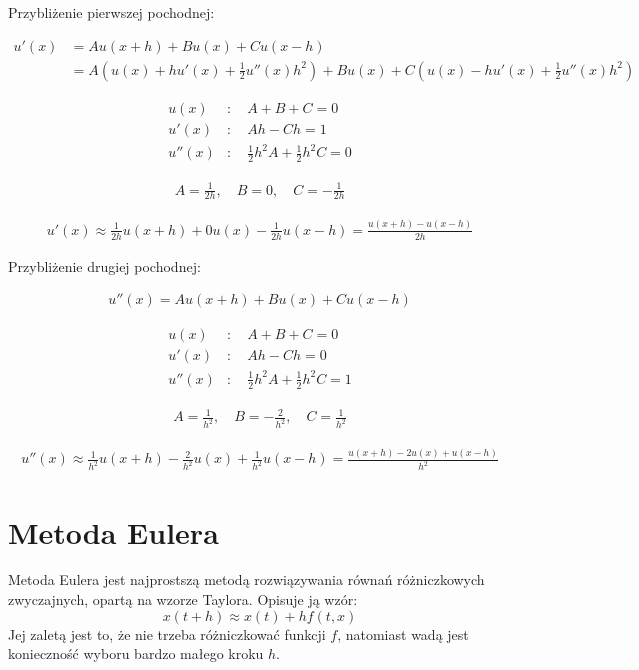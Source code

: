\documentclass[a4paper,12pt]{article}
\begin{document}
	Przybliżenie pierwszej pochodnej:
	
	\begin{align*}
		u'(x) &= Au(x+h) + Bu(x) + Cu(x-h) \\
		&= A(u(x) + hu'(x) + \frac{1}{2} u''(x)h^2) + B u(x) + C(u(x) - hu'(x) + \frac{1}{2} u''(x)h^2)
	\end{align*}
	
	\begin{align*}
		u(x) &: \quad A + B + C = 0 \\
		u'(x) &: \quad A h - Ch = 1 \\
		u''(x) &: \quad \frac{1}{2} h^2 A + \frac{1}{2} h^2 C = 0
	\end{align*}
	
	\begin{align*}
		A = \frac{1}{2h}, \quad B = 0, \quad C = -\frac{1}{2h}
	\end{align*}
	
	\begin{align*}
		u'(x) \approx \frac{1}{2h} u(x+h) + 0u(x) - \frac{1}{2h} u(x-h) = \frac{u(x+h) - u(x-h)}{2h}
	\end{align*}
	
	Przybliżenie drugiej pochodnej:
	
	\begin{align*}
		u''(x) = A u(x+h) + B u(x) + C u(x-h)
	\end{align*}
	
	\begin{align*}
		u(x) &: \quad A + B + C = 0 \\
		u'(x) &: \quad A h - Ch = 0 \\
		u''(x) &: \quad \frac{1}{2} h^2 A + \frac{1}{2} h^2 C = 1
	\end{align*}
	
	\begin{align*}
		A = \frac{1}{h^2}, \quad B = -\frac{2}{h^2}, \quad C = \frac{1}{h^2}
	\end{align*}
	
	\begin{align*}
		u''(x) \approx \frac{1}{h^2} u(x+h) - \frac{2}{h^2} u(x) + \frac{1}{h^2} u(x-h) = \frac{u(x+h) - 2u(x) + u(x-h)}{h^2}
	\end{align*}
	
	\section{Metoda Eulera}
	Metoda Eulera jest najprostszą metodą rozwiązywania równań różniczkowych zwyczajnych, opartą na wzorze Taylora. Opisuje ją wzór:
	\begin{equation}
		x(t+h) \approx x(t) + hf(t,x)
	\end{equation}
	Jej zaletą jest to, że nie trzeba różniczkować funkcji $f$, natomiast wadą jest konieczność wyboru bardzo małego kroku $h$.
	
\end{document}
